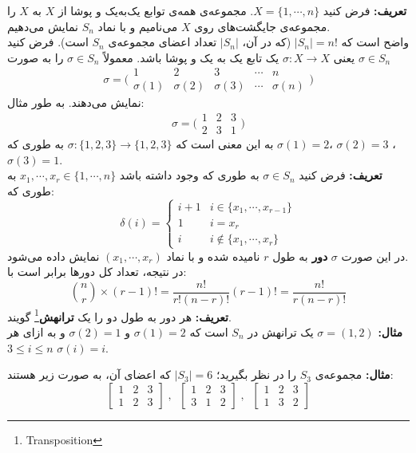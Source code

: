 	\textbf{تعریف:}
	فرض کنید $X = \{1,\cdots, n\}$. مجموعه‌ی همه‌ی توابع یک‌به‌یک و پوشا از $X$ به $X$ را مجموعه‌ی جایگشت‌های روی $X$ می‌نامیم و با نماد $S_n$ نمایش می‌دهیم.\\
	واضح است که
	 $|S_n| = n!$ 
	 (که در آن، $|S_n|$ تعداد اعضا‌ی مجموعه‌ی $S_n$ است). فرض کنید $\sigma\in S_n$ یعنی $\sigma: X\rightarrow X$ یک تابع یک به یک و پوشا باشد. معمولاً $\sigma \in S_n$ را به صورت 
	$$\sigma = \bigg( \begin{array}{ccccc}
	1  & 2 &3 & \cdots & n\\
	\sigma(1)     & \sigma(2) &\sigma(3) &\cdots& \sigma(n) 
	\end{array} \bigg)$$
	نمایش می‌دهند. به طور مثال:
	$$
	\sigma = \bigg( \begin{array}{ccccc}
	1  & 2 &3\\
	2 & 3 & 1
	\end{array} \bigg)
	$$
	به این معنی است که $\sigma: \{1,2,3\} \rightarrow \{1,2,3\}$ به طوری که $\sigma(1) = 2$، $\sigma(2)=3$ ، $\sigma(3) = 1$.\\
	\textbf{تعریف:}
	فرض کنید $\sigma \in S_n$ به طوری که وجود داشته باشد $x_1,\cdots,x_r \in \{ 1,\cdots,n\}$ به طوری که:
	$$\delta(i) =  \begin{cases}
	i+1 & i \in \{x_1,\cdots,x_{r-1}\}\\
	1 &  i = x_r\\
	i & i \notin \{x_1,\cdots,x_r\}
	\end{cases} $$
	در این صورت $\sigma$ \textbf{دور} به طول $r$ نامیده شده و با نماد $(x_1, \cdots,x_r)$ نمایش داده می‌شود.\\
	در نتیجه، تعداد کل دور‌ها برابر است با:
	$${n \choose r} \times (r-1)! = \frac{n!}{r!(n-r)!}(r-1)! = \frac{n!}{r(n-r)!}$$
	\textbf{تعریف:}
	هر دور به طول دو را یک \textbf{ترانهش}\footnote{Transposition} گویند.\\
	\textbf{مثال:}
	$\sigma = (1,2)$ یک ترانهش در $S_n$ است که $\sigma(1)=2$ و $\sigma(2) = 1$ و به ازای هر $3\leq i \leq n$ $\sigma(i) = i$.
	
	\textbf{مثال:}
	مجموعه‌ی $S_3$ را در نظر بگیرید؛ $|S_3| = 6$ که اعضای آن، به صورت زیر هستند:
	$$
	\begin{bmatrix}
	1 & 2 & 3 \\
	1 & 2 & 3
	\end{bmatrix} \; ,\; \;
	\begin{bmatrix}
	1 & 2 & 3 \\
	3 & 1 & 2
	\end{bmatrix} \; ,\; \;
	\begin{bmatrix}
	1 & 2 & 3 \\
	1 & 3 & 2
	\end{bmatrix}
	$$
	
